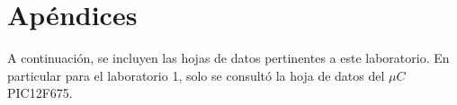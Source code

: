 \section{Apéndices}

A continuación, se incluyen las hojas de datos pertinentes a este laboratorio. En particular para el laboratorio 1, solo se consultó la hoja de datos del $\mu C$ PIC12F675.







